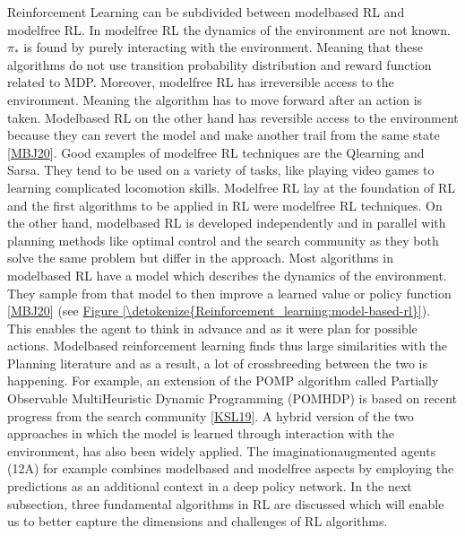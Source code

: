 \documentclass[letterpaper,10pt,english]{jupyterBook}
\begin{document}
\sphinxAtStartPar
Reinforcement Learning can be subdivided between model\sphinxhyphen{}based RL and model\sphinxhyphen{}free RL. In model\sphinxhyphen{}free RL the dynamics of the environment are not known. \(\pi_*\) is found by purely interacting with the environment. Meaning that these algorithms do not use transition probability distribution and reward function related to MDP. Moreover, model\sphinxhyphen{}free RL has irreversible access to the environment. Meaning the algorithm has to move forward after an action is taken. Model\sphinxhyphen{}based RL on the other hand has reversible access to the environment because they can revert the model and make another trail from the same state {[}\hyperlink{cite.Discussion:id7}{MBJ20}{]}. Good examples of model\sphinxhyphen{}free RL techniques are the Q\sphinxhyphen{}learning and Sarsa. They tend to be used on a variety of tasks, like playing video games to learning complicated locomotion skills. Model\sphinxhyphen{}free RL lay at the foundation of RL and the first algorithms to be applied in RL were model\sphinxhyphen{}free RL techniques. On the other hand, model\sphinxhyphen{}based RL is developed independently and in parallel with planning methods like optimal control and the search community as they both solve the same problem but differ in the approach. Most algorithms in model\sphinxhyphen{}based RL have a model which describes the dynamics of the environment. They sample from that model to then improve a learned value or policy function {[}\hyperlink{cite.Discussion:id7}{MBJ20}{]} (see \hyperref[\detokenize{Reinforcement_learning:model-based-rl}]{Figure \ref{\detokenize{Reinforcement_learning:model-based-rl}}}). This enables the agent to think in advance and as it were plan for possible actions. Model\sphinxhyphen{}based reinforcement learning finds thus large similarities with the Planning literature and as a result, a lot of cross\sphinxhyphen{}breeding between the two is happening. For example, an extension of the POMP algorithm called Partially Observable Multi\sphinxhyphen{}Heuristic Dynamic Programming (POMHDP) is based on recent progress from the search community {[}\hyperlink{cite.Discussion:id10}{KSL19}{]}. A hybrid version of the two approaches in which the model is learned through interaction with the environment, has also been widely applied. The imagination\sphinxhyphen{}augmented agents (12A) for example combines model\sphinxhyphen{}based and model\sphinxhyphen{}free aspects by employing the predictions as an additional context in a deep policy network.  In the next subsection, three fundamental algorithms in RL are discussed which will enable us to better capture the dimensions and challenges of RL algorithms.
\end{document}

